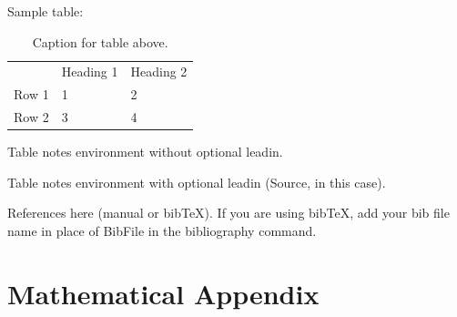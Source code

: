 \documentclass[AER]{AEA}
\begin{document}
Sample table:

\begin{table}
\caption{Caption for table above.}

\begin{tabular}{lll}
& Heading 1 & Heading 2 \\ 
Row 1 & 1 & 2 \\ 
Row 2 & 3 & 4%
\end{tabular}
\begin{tablenotes}
Table notes environment without optional leadin.
\end{tablenotes}
\begin{tablenotes}[Source]
Table notes environment with optional leadin (Source, in this case).
\end{tablenotes}
\end{table}

References here (manual or bibTeX). If you are using bibTeX, add your bib file 
name in place of BibFile in the bibliography command.



\appendix

\section{Mathematical Appendix}
\end{document}
